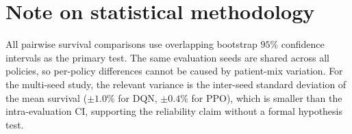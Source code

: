 \documentclass[11pt,a4paper]{article}
\begin{document}
\section*{Note on statistical methodology}

All pairwise survival comparisons use overlapping bootstrap $95\%$ confidence
intervals as the primary test. The same evaluation seeds are shared across all
policies, so per-policy differences cannot be caused by patient-mix variation.
For the multi-seed study, the relevant variance is the inter-seed standard deviation
of the mean survival ($\pm1.0\%$ for DQN, $\pm0.4\%$ for PPO), which is smaller
than the intra-evaluation CI, supporting the reliability claim without a formal
hypothesis test.

\end{document}
